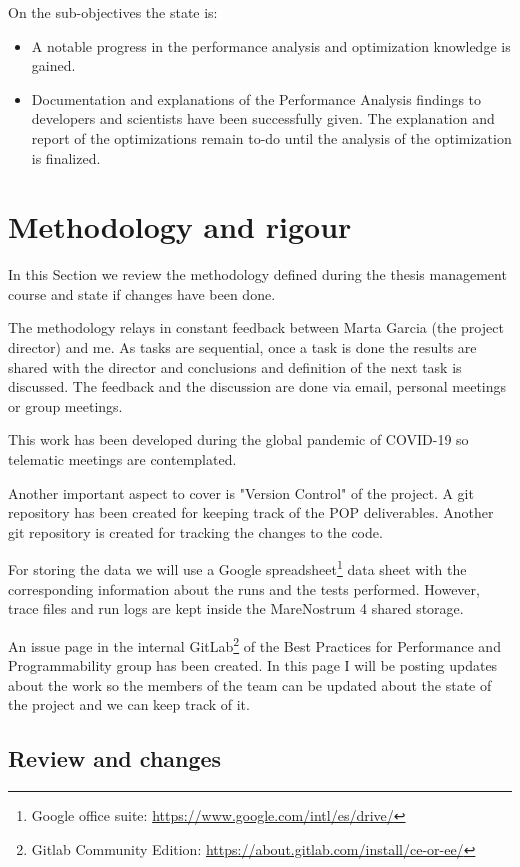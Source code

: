 On the sub-objectives the state is:
\begin{itemize}
  \item A notable progress in the performance analysis and optimization knowledge is gained.

  \item Documentation and explanations of the Performance Analysis findings to developers and scientists have been successfully given. The explanation and report of the optimizations remain to-do until the analysis of the optimization is finalized.
\end{itemize}

\section{Methodology and rigour}
In this Section we review the methodology defined during the thesis management course and state if changes have been done.

\justify
The methodology relays in constant feedback between Marta Garcia (the project director) and me. As tasks are sequential, once a task is done the results are shared with the director and conclusions and definition of the next task is discussed. The feedback and the discussion are done via email, personal meetings or group meetings.

\justify
This work has been developed during the global pandemic of COVID-19 so telematic meetings are contemplated.

\justify
Another important aspect to cover is "Version Control" of the project. A git repository has been created for keeping track of the POP deliverables. Another git repository is created for tracking the changes to the code.

\justify
For storing the data we will use a Google  spreadsheet\footnote{Google office suite: \url{https://www.google.com/intl/es/drive/}} data sheet with the corresponding information about the runs and the tests performed. However, trace files and run logs are kept inside the MareNostrum 4 shared storage.

\justify
An issue page in the internal GitLab\footnote{Gitlab Community Edition: \url{https://about.gitlab.com/install/ce-or-ee/}} of the Best Practices for Performance and Programmability group has been created. In this page I will be posting updates about the work so the members of the team can be updated about the state of the project and we can keep track of it.

\subsection{Review and changes}

